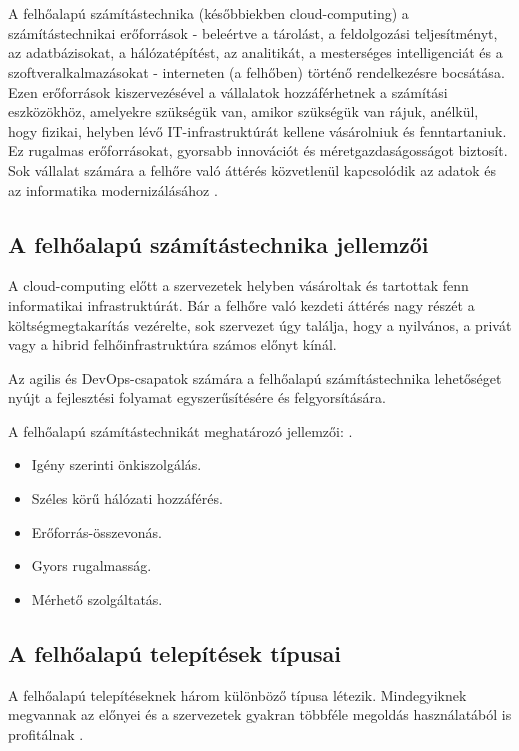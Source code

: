 \chapter{\clouds}
A felhőalapú számítástechnika (későbbiekben cloud-computing) a számítástechnikai erőforrások - beleértve a tárolást, a feldolgozási teljesítményt, az adatbázisokat, a hálózatépítést, az analitikát, a mesterséges intelligenciát és a szoftveralkalmazásokat - interneten (a felhőben) történő rendelkezésre bocsátása.
Ezen erőforrások kiszervezésével a vállalatok hozzáférhetnek a számítási eszközökhöz, amelyekre szükségük van, amikor szükségük van rájuk, anélkül, hogy fizikai, helyben lévő IT-infrastruktúrát kellene vásárolniuk és fenntartaniuk.
Ez rugalmas erőforrásokat, gyorsabb innovációt és méretgazdaságosságot biztosít.
Sok vállalat számára a felhőre való áttérés közvetlenül kapcsolódik az adatok és az informatika modernizálásához \cite{cloudComp}.

\section{A felhőalapú számítástechnika jellemzői}
A cloud-computing előtt a szervezetek helyben vásároltak és tartottak fenn informatikai infrastruktúrát.
Bár a felhőre való kezdeti áttérés nagy részét a költségmegtakarítás vezérelte, sok szervezet úgy találja, hogy a nyilvános, a privát vagy a hibrid felhőinfrastruktúra számos előnyt kínál.  

Az agilis és DevOps-csapatok számára a felhőalapú számítástechnika lehetőséget nyújt a fejlesztési folyamat egyszerűsítésére és felgyorsítására. 

A felhőalapú számítástechnikát meghatározó jellemzői: \cite{cloudComp}.

\begin{itemize}
    \item Igény szerinti önkiszolgálás.
    \item Széles körű hálózati hozzáférés.
    \item Erőforrás-összevonás.
    \item Gyors rugalmasság.
    \item Mérhető szolgáltatás.
\end{itemize}

\section{A felhőalapú telepítések típusai}
A felhőalapú telepítéseknek három különböző típusa létezik.
Mindegyiknek megvannak az előnyei és a szervezetek gyakran többféle megoldás használatából is profitálnak \cite{cloudComp}.

